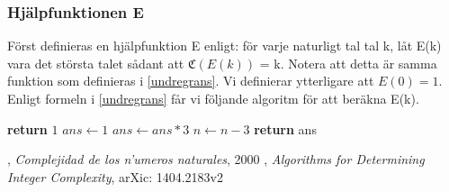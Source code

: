 \documentclass[a4paper,titlepage]{article}
\newcommand{\C}[1]{\mathfrak C \left( #1 \right)}
\renewcommand{\O}{\mathcal {O}}
\theoremstyle{definition}
\begin{document}
    \subsubsection{Hjälpfunktionen E}
    Först definieras en hjälpfunktion E enligt: för varje naturligt tal tal k, låt E(k) vara det största talet sådant att $\C{E(k)}$ = k.
    Notera att detta är samma funktion som definieras i \cref{undregrans}. Vi definierar ytterligare att $E(0) = 1$. Enligt formeln i \cref{undregrans} får vi följande algoritm för att beräkna E(k).

    \begin{algorithm}[H]
        \caption{$\O(N^2)$}
        \begin{algorithmic}[1]
                    \State \textbf{return} $1$
                \EndIf
                \State $ans \gets 1$
                    \State $ans \gets ans*3$
                    \State $n \gets n-3$
                \EndWhile
            \State \textbf{return} ans
            \EndProcedure
        \end{algorithmic}
    \end{algorithm}

\newpage
\begin{thebibliography}{9}

        , \emph{Complejidad de los n'umeros naturales}, 2000
     	, \emph{Algorithms for Determining Integer Complexity}, arXic: 1404.2183v2

\end{thebibliography}
%
\end{document}
